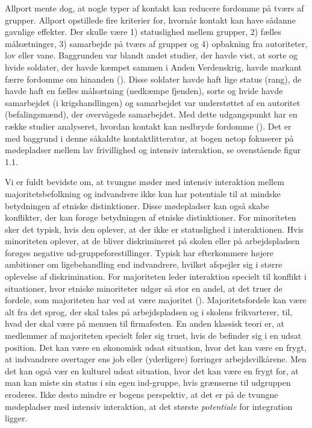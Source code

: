\documentclass[
]{book}
\begin{document}
Allport mente dog, at nogle typer af kontakt kan reducere fordomme på tværs af grupper. Allport opstillede fire kriterier for, hvornår kontakt kan have sådanne gavnlige effekter. Der skulle være 1) statuslighed mellem grupper, 2) fælles målsætninger, 3) samarbejde på tværs af grupper og 4) opbakning fra autoriteter, lov eller vane. Baggrunden var blandt andet studier, der havde vist, at sorte og hvide soldater, der havde kæmpet sammen i Anden Verdenskrig, havde markant færre fordomme om hinanden (). Disse soldater havde haft lige status (rang), de havde haft en fælles målsætning (nedkæmpe fjenden), sorte og hvide havde samarbejdet (i krigshandlingen) og samarbejdet var understøttet af en autoritet (befalingsmænd), der overvågede samarbejdet. Med dette udgangspunkt har en række studier analyseret, hvordan kontakt kan nedbryde fordomme (). Det er med baggrund i denne såkaldte kontaktlitteratur, at bogen netop fokuserer på mødepladser mellem lav frivillighed og intensiv interaktion, se ovenstående figur 1.1.

Vi er fuldt bevidste om, at tvungne møder med intensiv interaktion mellem majoritetsbefolkning og indvandrere ikke kun har potentiale til at mindske betydningen af etniske distinktioner. Disse mødepladser kan også skabe konflikter, der kan forøge betydningen af etniske distinktioner. For minoriteten sker det typisk, hvis den oplever, at der ikke er statuslighed i interaktionen. Hvis minoriteten oplever, at de bliver diskrimineret på skolen eller på arbejdspladsen forøges negative ud-gruppeforestillinger. Typisk har efterkommere højere ambitioner om ligebehandling end indvandrere, hvilket afspejler sig i større oplevelse af diskrimination. For majoriteten leder interaktion specielt til konflikt i situationer, hvor etniske minoriteter udgør så stor en andel, at det truer de fordele, som majoriteten har ved at være majoritet (). Majoritetsfordele kan være alt fra det sprog, der skal tales på arbejdspladsen og i skolens frikvarterer, til, hvad der skal være på menuen til firmafesten. En anden klassisk teori er, at medlemmer af majoriteten specielt føler sig truet, hvis de befinder sig i en udsat position. Det kan være en økonomisk udsat situation, hvor det kan være en frygt, at indvandrere overtager ens job eller (yderligere) forringer arbejdsvilkårene. Men det kan også vær en kulturel udsat situation, hvor det kan være en frygt for, at man kan miste sin status i sin egen ind-gruppe, hvis grænserne til udgruppen eroderes. Ikke desto mindre er bogens perspektiv, at det er på de tvungne mødepladser med intensiv interaktion, at det største \emph{potentiale} for integration ligger.
\end{document}
